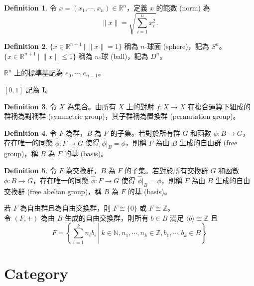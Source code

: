 \documentclass[12pt]{article}
\theoremstyle{definition}
\newtheorem{definition}{Definition}[section]
\newcommand\<{\langle}
\renewcommand\>{\rangle}
\begin{document}
\begin{CJK}{UTF8}{bsmi}
\begin{definition}
    令 $x=(x_1, \cdots, x_n)\in\mathbb{R}^n$，定義 $x$ 的範數 (norm) 為 
    \[
        \|x\|=\sqrt{\sum_{i=1}^n x_i^2}.
    \]
\end{definition}

\begin{definition}
    $\{x\in\mathbb{R}^{n+1}\ |\ \|x\|=1\}$ 稱為 $n$-球面 (sphere)，記為 $S^n$。$\{x\in\mathbb{R}^{n+1}\ |\ \|x\|\le1\}$ 稱為 $n$-球 (ball)，記為 $D^n$。
\end{definition}

$\mathbb{R}^{n}$ 上的標準基記為 $e_0, \cdots, e_{n-1}$。

$[0, 1]$ 記為 $\textbf{I}$。

\begin{definition}
    令 $X$ 為集合。由所有 $X$ 上的對射 $f:X\to X$ 在複合運算下組成的群稱為對稱群 (symmetric group)，其子群稱為置換群 (permutation group)。
\end{definition}

\begin{definition}
    令 $F$ 為群，$B$ 為 $F$ 的子集。若對於所有群 $G$ 和函數 $\phi:B\to G$，存在唯一的同態 $\hat{\phi}:F\to G$ 使得 $\hat{\phi}|_B=\phi$，則稱 $F$ 為由 $B$ 生成的自由群 (free group)，稱 $B$ 為 $F$ 的基 (basis)。
\end{definition}

\begin{definition}
    令 $F$ 為交換群，$B$ 為 $F$ 的子集。若對於所有交換群 $G$ 和函數 $\phi:B\to G$，存在唯一的同態 $\hat{\phi}:F\to G$ 使得 $\hat{\phi}|_B=\phi$，則稱 $F$ 為由 $B$ 生成的自由交換群 (free abelian group)，稱 $B$ 為 $F$ 的基 (basis)。
\end{definition}

若 $F$ 為自由群且為自由交換群，則 $F\cong\{0\}$ 或 $F\cong\mathbb{Z}$。 \\

令 $(F, +)$ 為由 $B$ 生成的自由交換群，則所有 $b\in B$ 滿足 $\<b\>\cong\mathbb{Z}$ 且
\[
    F = \left\{\left.\sum_{i=1}^k n_i b_i\ \right|\ k\in\mathbb{N}, n_1, \cdots, n_k\in\mathbb{Z}, b_1, \cdots, b_k\in B\right\}
\]

\section{Category}


\end{CJK}
\end{document}
